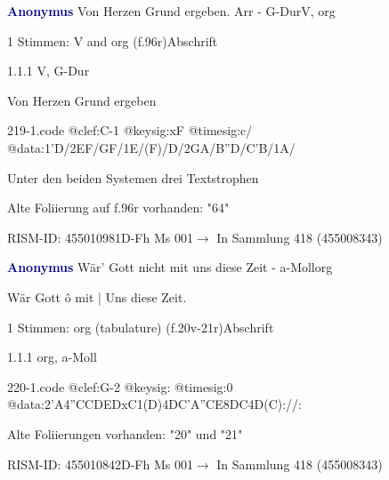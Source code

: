 \documentclass[twocolumn]{book}
\begin{document}
\par \vspace{7pt} \textcolor{darkblue}{\textbf{Anonymus  }}\hfillplus{\textbf{[219]}}\newline Von Herzen Grund ergeben. Arr - G-Dur\newline V, org
\par \begin{itshape}\end{itshape} 
\par \textcolor{darkblue}{}  1 Stimmen: V and org  (f.96r)\newline Abschrift
\par 1.1.1  V, G-Dur\newline \begin{footnotesize} Von Herzen Grund ergeben \end{footnotesize}  
\begin{filecontents*}{219-1.code}
@clef:C-1
@keysig:xF
@timesig:c/
@data:1'D/2EF/GF/1E/(F)/D/2GA/B''D/C'B/1A/
\end{filecontents*}
\newline
%
\par Unter den beiden Systemen drei Textstrophen
\par Alte Foliierung auf f.96r vorhanden: "64"
\par RISM-ID: 455010981\newline D-Fh  Ms 001\newline $\rightarrow$ In Sammlung 418 (455008343)
      
\par \vspace{7pt} \textcolor{darkblue}{\textbf{Anonymus  }}\hfillplus{\textbf{[220]}}\newline Wär' Gott nicht mit uns diese Zeit - a-Moll\newline org
\par \begin{itshape}[f.20v, at left:] Wär Gott ô mit | Uns diese Zeit.\end{itshape} 
\par \textcolor{darkblue}{}  1 Stimmen: org (tabulature)  (f.20v-21r)\newline Abschrift
\par 1.1.1  org, a-Moll  
\begin{filecontents*}{220-1.code}
@clef:G-2
@keysig:
@timesig:0
@data:2'A4''CCDEDxC1(D)4DC'A''CE{8DC}4D(C)://:
\end{filecontents*}
\newline
%
\par Alte Foliierungen vorhanden: "20" und "21"
\par RISM-ID: 455010842\newline D-Fh  Ms 001\newline $\rightarrow$ In Sammlung 418 (455008343)
      
\end{document}
